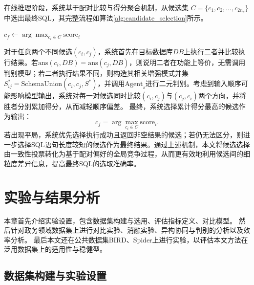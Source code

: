 在线推理阶段，系统基于配对比较与得分聚合机制，从候选集
$C=\{c_1,c_2,\ldots,c_{2n_c}\}$
中选出最终SQL，其完整流程如算法\ref{alg:candidate_selection}所示。

\begin{algorithm}[htbp]
	$c_f\leftarrow \arg\max_{c_i\in C}\text{score}_i$\;
	\caption{SQL候选集选取算法}
	\label{alg:candidate_selection}
	\end{algorithm}

对于任意两个不同候选$(c_i,c_j)$，系统首先在目标数据库$DB$上执行二者并比较执行结果。若$\text{ans}(c_i,DB)=\text{ans}(c_j,DB)$，则说明二者在功能上等价，无需调用判别模型；若二者执行结果不同，则构造其相关增强模式并集$S^{*}_{ij}=\text{SchemaUnion}(c_i,c_j,S^{*})$，并调用$\text{Agent}_s$进行二元判别。考虑到输入顺序可能影响模型输出，系统对每一对候选同时比较$(c_i,c_j)$与$(c_j,c_i)$两个方向，并将胜者分别累加得分，从而减轻顺序偏差。
最终，系统选择累计得分最高的候选作为输出：
\begin{equation}
c_f=\arg\max_{c_i\in C}\text{score}_i.
\label{eq:selection}
\end{equation}
若出现平局，系统优先选择执行成功且返回非空结果的候选；若仍无法区分，则进一步选择SQL语句长度较短的候选作为最终结果。通过上述机制，本文将候选选择由一致性投票转化为基于配对偏好的全局竞争过程，从而更有效地利用候选间的细粒度差异信息，提高最终SQL的选取准确率。



\section{实验与结果分析}
本章首先介绍实验设置，包含数据集构建与选用、评估指标定义、对比模型。
然后针对政务领域数据集上进行对比实验、消融实验、异构协同与判别的分析以及效率分析。
最后本文还在公共数据集BIRD\cite{liu2025bird}、Spider\cite{zeng2018spider}上进行实验，以评估本文方法在泛用数据集上的适用性与稳健型。

\subsection{数据集构建与实验设置}

